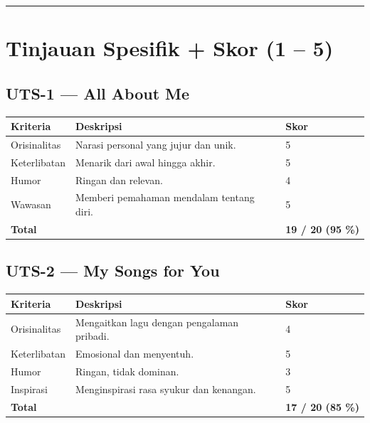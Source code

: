 \documentclass[
  letterpaper,
  DIV=11,
  numbers=noendperiod]{scrreprt}
\begin{document}
\begin{center}\rule{0.5\linewidth}{0.5pt}\end{center}

\section{Tinjauan Spesifik + Skor (1 --
5)}\label{tinjauan-spesifik-skor-1-5}

\subsection{\texorpdfstring{\textbf{UTS-1 --- All About
Me}}{UTS-1 --- All About Me}}\label{uts-1-all-about-me-1}

\begin{longtable}[]{@{}lll@{}}
\toprule\noalign{}
Kriteria & Deskripsi & Skor \\
\midrule\noalign{}
\endhead
\bottomrule\noalign{}
\endlastfoot
Orisinalitas & Narasi personal yang jujur dan unik. & 5 \\
Keterlibatan & Menarik dari awal hingga akhir. & 5 \\
Humor & Ringan dan relevan. & 4 \\
Wawasan & Memberi pemahaman mendalam tentang diri. & 5 \\
\textbf{Total} & & \textbf{19 / 20 (95 \%)} \\
\end{longtable}

\subsection{\texorpdfstring{\textbf{UTS-2 --- My Songs for
You}}{UTS-2 --- My Songs for You}}\label{uts-2-my-songs-for-you-1}

\begin{longtable}[]{@{}lll@{}}
\toprule\noalign{}
Kriteria & Deskripsi & Skor \\
\midrule\noalign{}
\endhead
\bottomrule\noalign{}
\endlastfoot
Orisinalitas & Mengaitkan lagu dengan pengalaman pribadi. & 4 \\
Keterlibatan & Emosional dan menyentuh. & 5 \\
Humor & Ringan, tidak dominan. & 3 \\
Inspirasi & Menginspirasi rasa syukur dan kenangan. & 5 \\
\textbf{Total} & & \textbf{17 / 20 (85 \%)} \\
\end{longtable}
\end{document}
